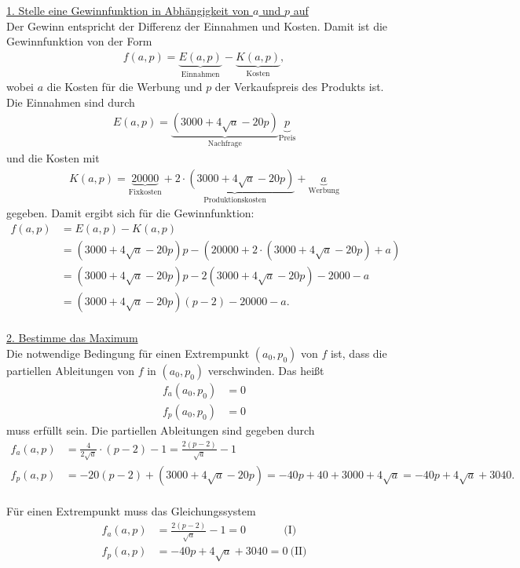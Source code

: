 \underline{1. Stelle eine Gewinnfunktion in Abhängigkeit von $ a $ und $ p $ auf}\\
Der Gewinn entspricht der Differenz der Einnahmen und Kosten. Damit ist die Gewinnfunktion von der Form
\begin{align*}
f(a,p) = \underbrace{E(a,p)}_{\textrm{Einnahmen}} - \underbrace{K(a,p)}_{\textrm{Kosten}},
\end{align*}
wobei $ a $ die Kosten für die Werbung und $ p $ der Verkaufspreis des Produkts ist. 
Die Einnahmen sind durch
\begin{align*}
E(a,p) =
\underbrace{(3000 + 4 \sqrt{a}- 20p)}_{\textrm{Nachfrage}} \underbrace{p}_{\textrm{Preis}}
\end{align*}
und die Kosten mit
\begin{align*}
K(a,p) = \underbrace{20000}_{\textrm{Fixkosten}}
+\underbrace{2 \cdot (3000 + 4 \sqrt{a}- 20p)}_{\textrm{Produktionskosten}} + \underbrace{a}_{\textrm{Werbung}}
\end{align*}
gegeben. Damit ergibt sich für die Gewinnfunktion:
\begin{align*}
f(a,p)
&= 
E(a,p) - K(a,p)\\
&=
(3000 + 4 \sqrt{a}- 20p)p - \left( 20000 +  2 \cdot (3000 + 4 \sqrt{a}- 20p) + a\right)\\
&=
(3000 + 4 \sqrt{a}- 20p)p -2(3000 + 4 \sqrt{a}- 20p) -2000 - a\\
&=
(3000 + 4 \sqrt{a}- 20p)(p-2) - 20000 - a.
\end{align*}
\ \\
\newpage
\underline{2. Bestimme das Maximum}\\
Die notwendige Bedingung für einen Extrempunkt $ (a_0,p_0) $ von $ f $ ist, dass die partiellen Ableitungen von $ f $ in $ (a_0,p_0) $ verschwinden.
Das heißt
\begin{align*}
f_a(a_0,p_0) &= 0\\
f_p(a_0,p_0) &= 0
\end{align*} 
muss erfüllt sein. Die partiellen Ableitungen sind gegeben durch
\begin{align*}
f_a(a,p)
&=
\frac{4}{2 \sqrt{a}}\cdot(p-2) -1 = 
\frac{2(p-2)}{\sqrt{a}} - 1\\
f_p(a,p) 
&=
-20(p-2) + (3000 + 4 \sqrt{a}- 20p)
= -40p + 40 + 3000 + 4 \sqrt{a}
= -40 p + 4 \sqrt{a} +3040.
\end{align*}
\ \\
Für einen Extrempunkt muss das Gleichungssystem
\begin{align*}
f_a(a,p) &=\frac{2(p-2)}{\sqrt{a}} - 1 = 0 \ \quad \quad \quad  \ \textrm{(I)}\\
f_p(a,p) &= -40 p + 4 \sqrt{a} +3040 = 0 \ \textrm{(II)}
\end{align*}
